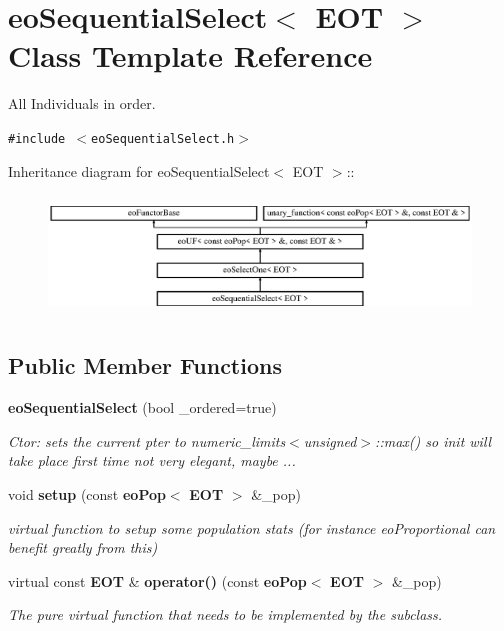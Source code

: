 \section{eo\-Sequential\-Select$<$ EOT $>$ Class Template Reference}
\label{classeo_sequential_select}
All Individuals in order.  


{\tt \#include $<$eo\-Sequential\-Select.h$>$}

Inheritance diagram for eo\-Sequential\-Select$<$ EOT $>$::\begin{figure}[H]
\begin{center}
\leavevmode
\includegraphics[height=3.23699cm]{classeo_sequential_select}
\end{center}
\end{figure}
\subsection*{Public Member Functions}
\begin{CompactItemize}
\item 
{\bf eo\-Sequential\-Select} (bool \_\-ordered=true)\label{classeo_sequential_select_a0}

\begin{CompactList}\small\item\em Ctor: sets the current pter to numeric\_\-limits$<$unsigned$>$::max() so init will take place first time not very elegant, maybe ... \item\end{CompactList}\item 
void {\bf setup} (const {\bf eo\-Pop}$<$ {\bf EOT} $>$ \&\_\-pop)\label{classeo_sequential_select_a1}

\begin{CompactList}\small\item\em virtual function to setup some population stats (for instance eo\-Proportional can benefit greatly from this) \item\end{CompactList}\item 
virtual const {\bf EOT} \& {\bf operator()} (const {\bf eo\-Pop}$<$ {\bf EOT} $>$ \&\_\-pop)\label{classeo_sequential_select_a2}

\begin{CompactList}\small\item\em The pure virtual function that needs to be implemented by the subclass. \item\end{CompactList}\end{CompactItemize}

